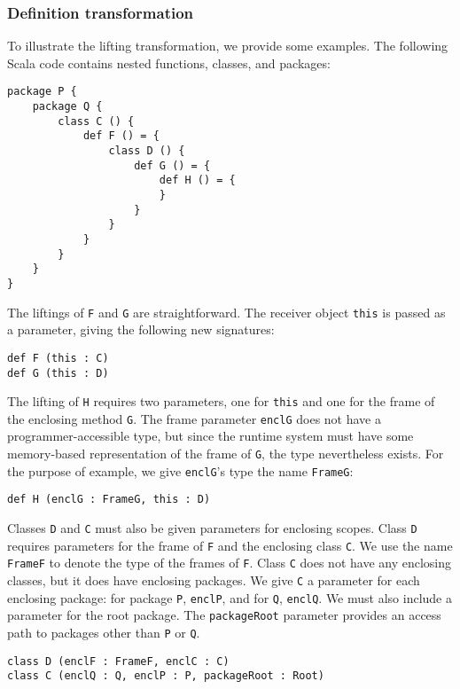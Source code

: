 \documentclass[letterpaper,11pt]{article}
\newcommand{\code}[1]{\lstinline$#1$}
\begin{document}
\subsubsection{Definition transformation}

To illustrate the lifting transformation, we provide some examples.
The following Scala code contains nested functions, classes, and packages:

\begin{lstlisting}
package P {
	package Q {
		class C () {
			def F () = {
				class D () {
					def G () = {
						def H () = {
						}
					}
				}
			}
		}
	}
}
\end{lstlisting}

The liftings of \code{F} and \code{G} are straightforward.
The receiver object \code{this} is passed as a parameter,
giving the following new signatures:

\begin{lstlisting}
def F (this : C)
def G (this : D)
\end{lstlisting}


The lifting of \code{H} requires two parameters, one for \code{this}
and one for the frame of the enclosing method \code{G}.
The frame parameter \code{enclG} does not have a programmer-accessible type,
but since the runtime system must have some memory-based
representation of the frame of \code{G}, the type nevertheless exists.
For the purpose of example, we give \code{enclG}'s type the name \code{FrameG}:

\begin{lstlisting}
def H (enclG : FrameG, this : D)
\end{lstlisting}

Classes \code{D} and \code{C} must also be given parameters for enclosing scopes.
Class \code{D} requires parameters for the frame of \code{F} and
the enclosing class \code{C}.
We use the name \code{FrameF} to denote the type of the frames of \code{F}.
Class \code{C} does not have any enclosing classes, but it does have enclosing
packages.
We give \code{C} a parameter for each enclosing package: for package \code{P},
\code{enclP}, and for \code{Q}, \code{enclQ}.
We must also include a parameter for the root package.
The \code{packageRoot} parameter provides an access path to packages other than \code{P} or \code{Q}.

\begin{lstlisting}
class D (enclF : FrameF, enclC : C)
class C (enclQ : Q, enclP : P, packageRoot : Root)
\end{lstlisting}
\end{document}
